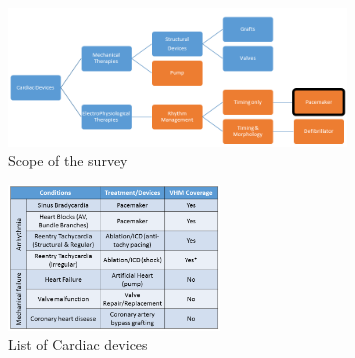 \documentclass[openany]{now} %
\begin{document}
\begin{itemize}
        
        
        
\end{itemize}


\begin{figure}[!b]
		\centering
		\includegraphics[width=0.8\textwidth]{figs/Fig1.png}
		\caption{\small Scope of the survey}
		\label{fig:scope}
\end{figure}
\begin{figure}[!b]
		\centering
		\includegraphics[width=0.5\textwidth]{figs/devices.png}
		\caption{\small List of Cardiac devices}
		\label{fig:devices}
\end{figure}
\end{document}
